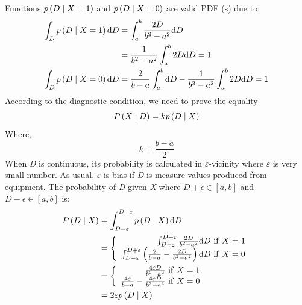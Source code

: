 \documentclass{article}
\numberwithin{equation}{section}
\numberwithin{figure}{section}
\numberwithin{table}{section}
\begin{document}
Functions $p\left(D\mathrel{\left|\vphantom{D X=1}\right.\kern-\nulldelimiterspace}X=1\right)$ and $p\left(D\mathrel{\left|\vphantom{D X=0}\right.\kern-\nulldelimiterspace}X=0\right)$ are valid PDF (s) due to:
\begin{align*}
\int_D{p\left(D\mathrel{\left|\vphantom{D X=1}\right.\kern-\nulldelimiterspace}X=1\right)\mathrm{d}D}&=\int^b_a{\frac{2D}{b^2-a^2}\mathrm{d}D}\\
&=\frac{1}{b^2-a^2}\int^b_a{2D\mathrm{d}D}=1\\
\int_D{p\left(D\mathrel{\left|\vphantom{D X=0}\right.\kern-\nulldelimiterspace}X=0\right)\mathrm{d}D}&=\frac{2}{b-a}\int^b_a{\mathrm{d}D}-\frac{1}{b^2-a^2}\int^b_a{2D\mathrm{d}D}=1
\end{align*}
According to the diagnostic condition, we need to prove the equality
\[P\left(X\mathrel{\left|\vphantom{X D}\right.\kern-\nulldelimiterspace}D\right)=kp\left(D\mathrel{\left|\vphantom{D X}\right.\kern-\nulldelimiterspace}X\right)\] 
Where,
\[k=\frac{b-a}{2}\] 
When \textit{D} is continuous, its probability is calculated in \textit{$\varepsilon$}-vicinity where \textit{$\varepsilon$} is very small number. As usual, \textit{$\varepsilon$} is bias if \textit{D} is measure values produced from equipment. The probability of \textit{D} given \textit{X} where $D+\epsilon \in \left[a,b\right]$ and $D-\epsilon \in \left[a,b\right]$ is:
\begin{align*}
P\left(D\mathrel{\left|\vphantom{D X}\right.\kern-\nulldelimiterspace}X\right)&=\int^{D+\varepsilon }_{D-\varepsilon }{p\left(D\mathrel{\left|\vphantom{D X}\right.\kern-\nulldelimiterspace}X\right)\mathrm{d}D}\\
&=\left\{ \begin{array}{r}
\int^{D+\varepsilon }_{D-\varepsilon }{\frac{2D}{b^2-a^2}\mathrm{d}D}\ \mathrm{if}\ X=1 \\ 
\int^{D+\varepsilon }_{D-\varepsilon }{\left(\frac{2}{b-a}-\frac{2D}{b^2-a^2}\right)\mathrm{d}D}\ \mathrm{if}\ X=0 \end{array}
\right.\\
&=\left\{ \begin{array}{r}
\frac{4\varepsilon D}{b^2-a^2}\ \mathrm{if}\ X=1 \\ 
\frac{4\varepsilon }{b-a}-\frac{4\varepsilon D}{b^2-a^2}\ \mathrm{if}\ X=0 \end{array}
\right.\\
&=2\varepsilon p\left(D\mathrel{\left|\vphantom{D X}\right.\kern-\nulldelimiterspace}X\right)
\end{align*}
\end{document}
